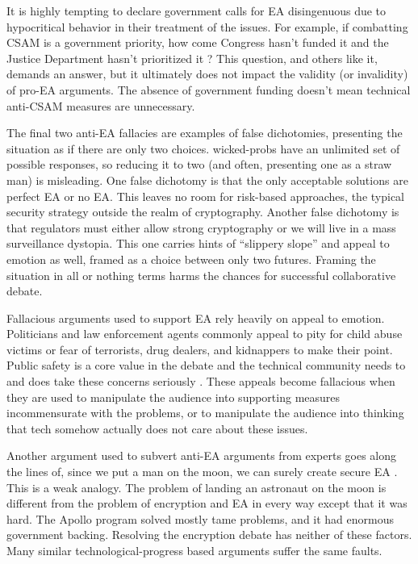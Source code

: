 It is highly tempting to declare government calls for \ac{EA} disingenuous due to hypocritical behavior in their
treatment of the issues. For example, if combatting \ac{CSAM} is a government priority, how come Congress hasn't funded
it and the Justice Department hasn't prioritized it \cite{keller_internet_2019}? This question, and others like it,
demands an answer, but it ultimately does not impact the validity (or invalidity) of pro-\ac{EA} arguments. The absence
of government funding doesn't mean technical anti-\ac{CSAM} measures are unnecessary.

The final two anti-\ac{EA} fallacies are examples of false dichotomies, presenting the situation as if there are only
two choices. \Acp{wicked-prob} have an unlimited set of possible responses, so reducing it to two (and often, presenting
one as a straw man) is misleading. One false dichotomy is that the only acceptable solutions are perfect \ac{EA} or no
\ac{EA}. This leaves no room for risk-based approaches, the typical security strategy outside the realm of cryptography.
Another false dichotomy is that regulators must either allow strong cryptography or we will live in a mass surveillance
dystopia. This one carries hints of ``slippery slope'' and appeal to emotion as well, framed as a choice between only
two futures. Framing the situation in all or nothing terms harms the chances for successful collaborative debate.

Fallacious arguments used to support \ac{EA} rely heavily on appeal to emotion. Politicians and law enforcement agents
commonly appeal to pity for child abuse victims or fear of terrorists, drug dealers, and kidnappers to make their point.
Public safety is a core value in the debate and the technical community needs to and does take these concerns seriously
\cite{schneier_scaring_2019}. These appeals become fallacious when they are used to manipulate the audience into
supporting measures incommensurate with the problems, or to manipulate the audience into thinking that tech somehow
actually does not care about these issues.

Another argument used to subvert anti-EA arguments from experts goes along the lines of, since we put a man on the moon,
we can surely create secure \ac{EA} \cite{cushing_moon_2018}. This is a weak analogy. The problem of landing an
astronaut on the moon is different from the problem of encryption and \ac{EA} in every way except that it was hard. The
Apollo program solved mostly tame problems, and it had enormous government backing. Resolving the encryption debate has
neither of these factors. Many similar technological-progress based arguments suffer the same faults.

